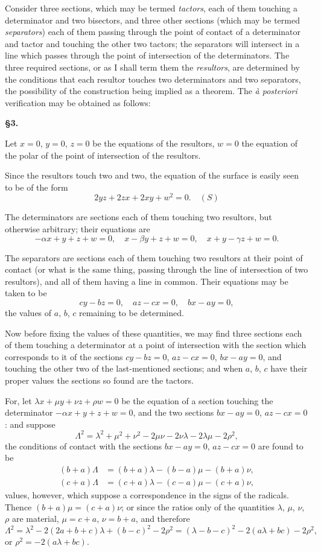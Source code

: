 \documentclass[11pt,a4paper]{book}
\begin{document}
Consider three sections, which may be termed \textit{tactors}, each of them touching a determinator and two bisectors, and three other sections (which may be termed \textit{separators}) each of them passing through the point of contact of a determinator and tactor and touching the other two tactors; the separators will intersect in a line which passes through the point of intersection of the determinators. The three required sections, or as I shall term them the \textit{resultors}, are determined by the conditions that each resultor touches two determinators and two separators, the possibility of the construction being implied as a theorem. The \textit{\`a posteriori} verification may be obtained as follows:

\noindent\textbf{\S 3.}

Let $x=0$, $y=0$, $z=0$ be the equations of the resultors, $w=0$ the equation of the polar of the point of intersection of the resultors.

Since the resultors touch two and two, the equation of the surface is easily seen to be of the form
\[
2yz + 2zx + 2xy + w^2 = 0. \quad (S)
\]

The determinators are sections each of them touching two resultors, but otherwise arbitrary; their equations are
\[
-\alpha x + y + z + w = 0, \quad x - \beta y + z + w = 0, \quad x + y - \gamma z + w = 0.
\]

The separators are sections each of them touching two resultors at their point of contact (or what is the same thing, passing through the line of intersection of two resultors), and all of them having a line in common. Their equations may be taken to be
\[
cy - bz = 0, \quad az - cx = 0, \quad bx - ay = 0,
\]
the values of $a$, $b$, $c$ remaining to be determined.

Now before fixing the values of these quantities, we may find three sections each of them touching a determinator at a point of intersection with the section which corresponds to it of the sections $cy-bz=0$, $az-cx=0$, $bx-ay=0$, and touching the other two of the last-mentioned sections; and when $a$, $b$, $c$ have their proper values the sections so found are the tactors.

\newpage
\setcounter{page}{60}

For, let $\lambda x + \mu y + \nu z + \rho w = 0$ be the equation of a section touching the determinator $-\alpha x + y + z + w = 0$, and the two sections $bx-ay=0$, $az-cx=0$: and suppose
\[
\Lambda^2 = \lambda^2 + \mu^2 + \nu^2 - 2\mu\nu - 2\nu\lambda - 2\lambda\mu - 2\rho^2,
\]
the conditions of contact with the sections $bx-ay=0$, $az-cx=0$ are found to be
\begin{align*}
(b+a)\Lambda &= (b+a)\lambda - (b-a)\mu - (b+a)\nu,\\
(c+a)\Lambda &= (c+a)\lambda - (c-a)\mu - (c+a)\nu,
\end{align*}
values, however, which suppose a correspondence in the signs of the radicals. Thence $(b+a)\mu = (c+a)\nu$; or since the ratios only of the quantities $\lambda$, $\mu$, $\nu$, $\rho$ are material, $\mu = c+a$, $\nu = b+a$, and therefore
\[
\Lambda^2 = \lambda^2 - 2(2a+b+c)\lambda + (b-c)^2 - 2\rho^2 = (\lambda - b - c)^2 - 2(a\lambda+bc) - 2\rho^2,
\]
or $\rho^2 = -2(a\lambda+bc)$.
\end{document}
